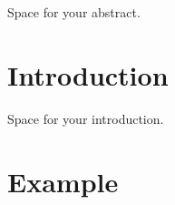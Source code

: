 \documentclass[a4paper,oneside,10pt,ngerman,english]{scrartcl}
\begin{document}

\cleardoubleoddpage
\tableofcontents



\cleardoubleoddpage


Space for your abstract.




\cleardoubleoddpage

\section{Introduction}
\label{sec:introduction}

Space for your introduction.


\section{Example}
\label{sec:example}
\end{document}
